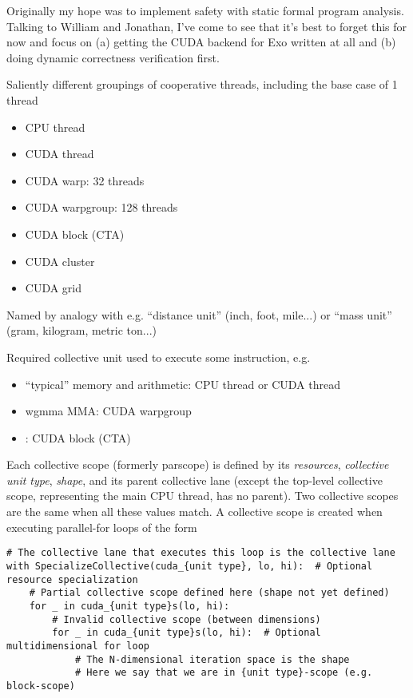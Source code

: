 Originally my hope was to implement safety with static formal program analysis.
Talking to William and Jonathan, I've come to see that it's best to forget this for now and focus on (a) getting the CUDA backend for Exo written at all and (b) doing dynamic correctness verification first.

\filbreak
{}

\filbreak
{} Saliently different groupings of cooperative threads, including the base case of 1 thread
\begin{itemize}
  \item CPU thread
  \item CUDA thread
  \item CUDA warp: 32 threads
  \item CUDA warpgroup: 128 threads
  \item CUDA block (CTA)
  \item CUDA cluster
  \item CUDA grid
\end{itemize}
Named by analogy with e.g. ``distance unit'' (inch, foot, mile...) or ``mass unit'' (gram, kilogram, metric ton...)

\filbreak
{} Required collective unit used to execute some instruction, e.g.
\begin{itemize}
  \item ``typical'' memory and arithmetic: CPU thread or CUDA thread
  \item wgmma MMA: CUDA warpgroup
  \item {}: CUDA block (CTA)
\end{itemize}

\filbreak
{} Each collective scope (formerly parscope) is defined by its \textit{resources}, \textit{collective unit type}, \textit{shape}, and its parent collective lane (except the top-level collective scope, representing the main CPU thread, has no parent). Two collective scopes are the same when all these values match. A collective scope is created when executing parallel-for loops of the form

{\color{lightttColor}
\begin{verbatim}
# The collective lane that executes this loop is the collective lane
with SpecializeCollective(cuda_{unit type}, lo, hi):  # Optional resource specialization
    # Partial collective scope defined here (shape not yet defined)
    for _ in cuda_{unit type}s(lo, hi):
        # Invalid collective scope (between dimensions)
        for _ in cuda_{unit type}s(lo, hi):  # Optional multidimensional for loop
            # The N-dimensional iteration space is the shape
            # Here we say that we are in {unit type}-scope (e.g. block-scope)
\end{verbatim}
}

